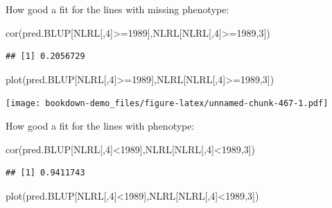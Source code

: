 \documentclass[
]{book}
\newenvironment{Shaded}{\begin{snugshade}}{\end{snugshade}}
\newcommand{\DecValTok}[1]{\textcolor[rgb]{0.00,0.00,0.81}{#1}}
\newcommand{\FunctionTok}[1]{\textcolor[rgb]{0.00,0.00,0.00}{#1}}
\newcommand{\NormalTok}[1]{#1}
\newcommand{\SpecialCharTok}[1]{\textcolor[rgb]{0.00,0.00,0.00}{#1}}
\begin{document}
How good a fit for the lines with missing phenotype:

\begin{Shaded}
\begin{Highlighting}[]
\FunctionTok{cor}\NormalTok{(pred.BLUP[NLRL[,}\DecValTok{4}\NormalTok{]}\SpecialCharTok{\textgreater{}=}\DecValTok{1989}\NormalTok{],NLRL[NLRL[,}\DecValTok{4}\NormalTok{]}\SpecialCharTok{\textgreater{}=}\DecValTok{1989}\NormalTok{,}\DecValTok{3}\NormalTok{])}
\end{Highlighting}
\end{Shaded}

\begin{verbatim}
## [1] 0.2056729
\end{verbatim}

\begin{Shaded}
\begin{Highlighting}[]
\FunctionTok{plot}\NormalTok{(pred.BLUP[NLRL[,}\DecValTok{4}\NormalTok{]}\SpecialCharTok{\textgreater{}=}\DecValTok{1989}\NormalTok{],NLRL[NLRL[,}\DecValTok{4}\NormalTok{]}\SpecialCharTok{\textgreater{}=}\DecValTok{1989}\NormalTok{,}\DecValTok{3}\NormalTok{])}
\end{Highlighting}
\end{Shaded}

\texttt{[image: bookdown-demo\_files/figure-latex/unnamed-chunk-467-1.pdf]}

How good a fit for the lines with phenotype:

\begin{Shaded}
\begin{Highlighting}[]
\FunctionTok{cor}\NormalTok{(pred.BLUP[NLRL[,}\DecValTok{4}\NormalTok{]}\SpecialCharTok{\textless{}}\DecValTok{1989}\NormalTok{],NLRL[NLRL[,}\DecValTok{4}\NormalTok{]}\SpecialCharTok{\textless{}}\DecValTok{1989}\NormalTok{,}\DecValTok{3}\NormalTok{])}
\end{Highlighting}
\end{Shaded}

\begin{verbatim}
## [1] 0.9411743
\end{verbatim}

\begin{Shaded}
\begin{Highlighting}[]
\FunctionTok{plot}\NormalTok{(pred.BLUP[NLRL[,}\DecValTok{4}\NormalTok{]}\SpecialCharTok{\textless{}}\DecValTok{1989}\NormalTok{],NLRL[NLRL[,}\DecValTok{4}\NormalTok{]}\SpecialCharTok{\textless{}}\DecValTok{1989}\NormalTok{,}\DecValTok{3}\NormalTok{])}
\end{Highlighting}
\end{Shaded}
\end{document}
